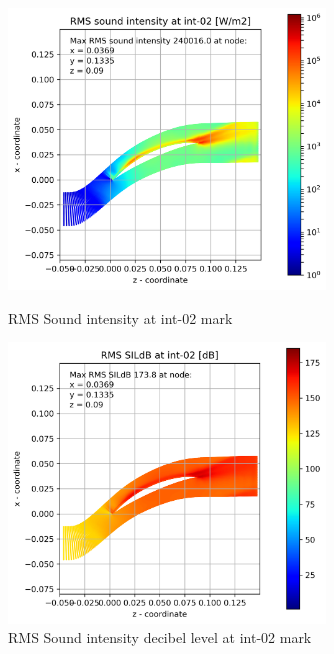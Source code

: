 \begin{figure}[ht]
  \centering
  \includegraphics[width=0.75\textwidth]{Figures/int-02-rms-sil.png}
  \caption{RMS Sound intensity at int-02 mark} \label{int-02-rms-sil}
  
  \vspace*{\floatsep}%

  \includegraphics[width=0.75\textwidth]{Figures/int-02-rms-sildb.png}
  \caption{RMS Sound intensity decibel level at int-02 mark} \label{int-02-rms-sildb}
\end{figure}

